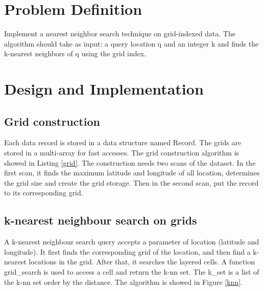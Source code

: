 \documentclass{article}
\def\v#1{{\fontfamily{cmtt}\selectfont #1}}
\begin{document}
\section{Problem Definition}
Implement a nearest neighbor search technique on grid-indexed data.
The algorithm should take as input: a query location q and an integer k and
finds the k-nearest neighbors of q using the grid index.

\section{Design and Implementation}
\subsection{Grid construction}
Each data record is stored in a data structure named \v{Record}. The grids
are stored in a multi-array for fast accesses. The grid construction algorithm
is showed in Listing \ref{grid}. The construction needs two scans of the dataset.
In the first scan, it finds the maximum latitude and longitude of all location,
determines the grid size and create the grid storage.
Then in the second scan, put the record to its corresponding grid.
\subsection{k-nearest neighbour search on grids}
A k-nearest neighbour search query accepts a parameter of
location (latitude and longitude). It first finds the corresponding
grid of the location, and then find a k-nearest locations in the grid.
After that, it searches the layered cells. A function \v{grid\_search}
is used to access a cell and return the k-nn set. The \v{k\_set} is
a list of the k-nn set order by the distance.
The algorithm is showed in
Figure \ref{knn}.
\end{document}

